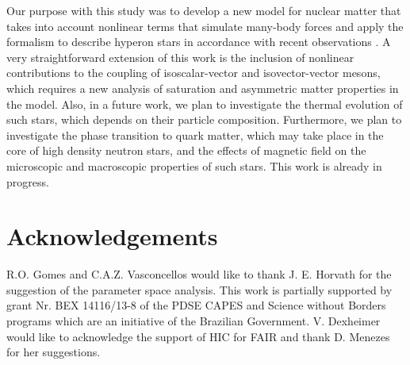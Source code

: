\documentclass[twocolumn,showpacs,aps]{revtex4}
\begin{document}
Our purpose with this study was to develop a new model for nuclear matter that takes into account nonlinear terms that
simulate many-body forces and apply the formalism to describe hyperon stars in accordance with recent observations \cite{Antoniadis2013,Demorest2010}. 
A very straightforward extension of this work is the inclusion of nonlinear contributions to the coupling of isoscalar-vector 
and isovector-vector mesons, which requires a new analysis of saturation and asymmetric matter properties in the model.
Also, in a future work, we plan to investigate the thermal evolution of such stars, which depends on their particle composition.
Furthermore, we plan to investigate the phase transition to quark matter, which may take place in the core of high density neutron stars, 
and the effects of magnetic field on the microscopic and macroscopic properties of such stars.
This work is already in progress.

\section{Acknowledgements}
R.O. Gomes and C.A.Z. Vasconcellos would like to thank J. E. Horvath for the suggestion of the parameter space analysis. 
This work is partially supported by grant Nr. BEX 14116/13-8 of the PDSE CAPES and Science without Borders programs 
which are an initiative of the Brazilian Government.
V. Dexheimer would like to acknowledge the support of HIC for FAIR and thank D. Menezes for her suggestions.



%
\end{document}
